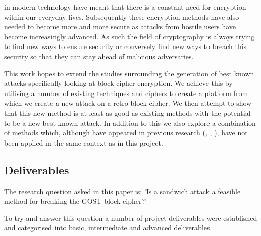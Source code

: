 \documentclass[10pt,journal,compsoc]{IEEEtran}
\begin{document}
% 
% 
 in modern technology have meant that there is a constant need for encryption within our everyday lives. Subsequently these encryption methods have also needed to become more and more secure as attacks from hostile users have become increasingly advanced. As such the field of cryptography is always trying to find new ways to ensure security or conversely find new ways to breach this security so that they can stay ahead of malicious adversaries.

This work hopes to extend the studies surrounding the generation of best known attacks specifically looking at block cipher encryption. We achieve this by utilising a number of existing techniques and ciphers to create a platform from which we create a new attack on a retro block cipher. We then attempt to show that this new method is at least as good as existing methods with the potential to be a new best known attack. In addition to this we also explore a combination of methods which, although have appeared in previous research (\cite{Sun_Gerault_Wang_Wang_2020}, \cite{fse-2007-3268}, \cite{fse-2004-3110}), have not been applied in the same context as in this project. 

\subsection{Deliverables}
The research question asked in this paper is: 'Is a sandwich attack a feasible method for breaking the GOST block cipher?'

To try and answer this question a number of project deliverables were established and categorised into basic, intermediate and advanced deliverables. 
\end{document}

